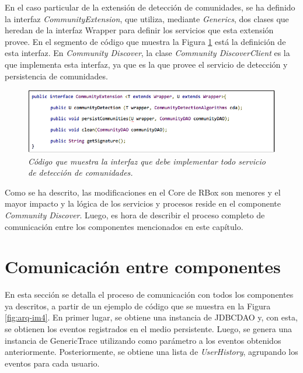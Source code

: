 En el caso particular de la extensión de detección de comunidades, se ha definido la interfaz \textit{CommunityExtension}, que utiliza, mediante \textit{Generics}, dos clases que heredan de la interfaz Wrapper para definir los servicios que esta extensión provee. En el segmento de código que muestra la Figura \ref{fig:arq-im3} está la definición de esta interfaz. En \textit{Community Discover}, la clase \textit{Community Discover}\textit{Client} es la que implementa esta interfaz, ya que es la que provee el servicio de detección y persistencia de comunidades.

\begin{figure}[H]
  \centering
  \includegraphics[scale=.6]{images/Figura4-3}
  \caption{\em Código que muestra la interfaz que debe implementar todo servicio de detección de comunidades.}
  \label{fig:arq-im3}
\end{figure}

Como se ha descrito, las modificaciones en el Core de RBox son menores y el mayor impacto y la lógica de los servicios y procesos reside en el componente \textit{Community Discover}. Luego, es hora de describir el proceso completo de comunicación entre los componentes mencionados en este capítulo.

\section{Comunicación entre componentes}

En esta sección se detalla el proceso de comunicación con todos los componentes ya descritos, a partir de un ejemplo de código que se muestra en la Figura \ref{fig:arq-im4}. En primer lugar, se obtiene una instancia de JDBCDAO y, con esta, se obtienen los eventos registrados en el medio persistente. Luego, se genera una instancia de GenericTrace utilizando como parámetro a los eventos obtenidos anteriormente. Posteriormente, se obtiene una lista de \textit{UserHistory}, agrupando los eventos para cada usuario.

